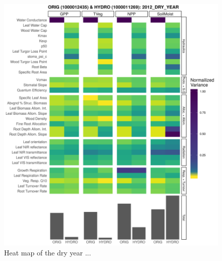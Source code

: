 

\begin{figure}[h]
    \centering
    \includegraphics[width=.75\textheight]{Hydro_Paper_LaTeX/Hydro_Paper_Figures/heatmap_bar_dry_year.png}
    \caption[Heatmap of the dry year]{Heat map of the dry year ... }
    \label{fig:heatmap_dry}
\end{figure}